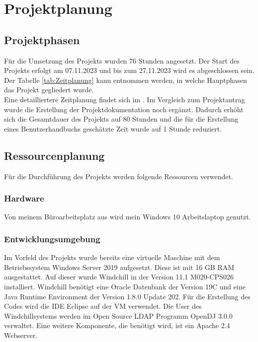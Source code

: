 \section{Projektplanung} 
\label{sec:Projektplanung}


\subsection{Projektphasen}
\label{sec:Projektphasen}

Für die Umsetzung des Projekts wurden 76 Stunden angesetzt.
Der Start des Projekts erfolgt am 07.11.2023 und bis zum 27.11.2023 wird es abgeschlossen sein.
Der Tabelle \ref{tab:Zeitplanung} kann entnommen werden, in welche Hauptphasen das Projekt gegliedert wurde.
\\
Eine detailliertere Zeitplanung findet sich im .
Im Vergleich zum Projektantrag wurde die Erstellung der Projektdokumentation noch ergänzt.
Dadurch erhöht sich die Gesamtdauer des Projekts auf 80 Stunden und die für die Erstellung eines Benutzerhandbuchs geschätzte Zeit wurde auf 1 Stunde reduziert.


\subsection{Ressourcenplanung}
\label{sec:Ressourcenplanung}

Für die Durchführung des Projekts werden folgende Ressourcen verwendet.

\subsubsection{Hardware}
Von meinem Büroarbeitsplatz aus wird mein Windows 10 Arbeitslaptop genutzt.

\subsubsection{Entwicklungsumgebung}
Im Vorfeld des Projekts wurde bereits eine virtuelle Maschine mit dem Betriebssystem Windows Server 2019 aufgesetzt.
Diese ist mit 16 GB RAM ausgestattet.
Auf dieser wurde Windchill in der Version 11.1 M020-CPS026 installiert.
Windchill benötigt eine Oracle Datenbank der Version 19C und eine Java Runtime Environment der Version 1.8.0 Update 202.
Für die Erstellung des Codes wird die IDE Eclipse auf der \acs{VM} verwendet.
Die User des Windchillsystems werden im Open Source LDAP Programm OpenDJ 3.0.0 verwaltet.
Eine weitere Komponente, die benötigt wird, ist ein Apache 2.4 Webserver.

